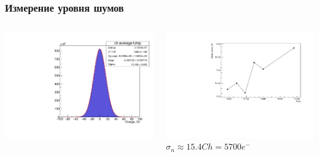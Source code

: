 \documentclass[14pt]{beamer}
\begin{document}
\begin{frame}[c]
\frametitle{Измерение уровня шумов}
\vspace{10pt}
\begin{columns}
	\begin{minipage}[t][1\textheight]{\linewidth}
		\vspace*{38pt}
		\includegraphics[width=1\linewidth]{Noise_stat.pdf}
	\end{minipage}%
	\begin{minipage}[t][1\textheight]{\linewidth}
	\vspace*{30pt}
	\includegraphics[width=1\linewidth]{Noise_time_drift.pdf}
	\\ \centering \small{$\sigma_{n} \approx 15.4 Ch = 5700 e^{-}$}
	\end{minipage}
\end{columns}
\end{frame}
\end{document}
